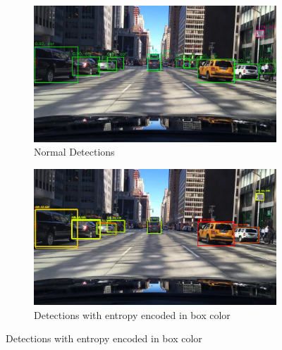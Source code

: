    \begin{figure}[H]
    	\centering
    	\begin{subfigure}[t]{0.495\textwidth}
    		\centering
    		\includegraphics[width=\textwidth]{images/det_images/bdd_1.jpg}
    		\caption{Normal Detections}
    	\end{subfigure}
    	\begin{subfigure}[t]{0.495\textwidth}
    		\centering
    		\includegraphics[width=\textwidth]{images/det_images/bdd_subens_entropies_0.png}
    		\caption{Detections with entropy encoded in box color}
    	\end{subfigure}
    \end{figure}
